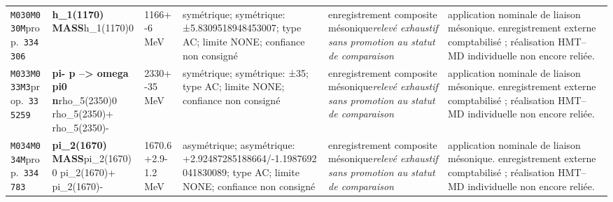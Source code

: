 \begin{landscape}
\begin{longtable}{L{1.85cm}L{4.45cm}L{2.35cm}L{4.05cm}L{3.35cm}L{7.15cm}}
\texttt{M030}\newline \texttt{M030M}\newline prop.\ \texttt{334306} & \textbf{h\_\allowbreak{}1(1170) MASS}\newline h\_\allowbreak{}1(1170)0 & 1166+-6\,MeV & symétrique; symétrique: ±5.8309518948453007; type AC; limite NONE; confiance non consigné & enregistrement composite mésonique\newline \emph{relevé exhaustif sans promotion au statut de comparaison} & application nominale de liaison mésonique. enregistrement externe comptabilisé ; réalisation HMT--MD individuelle non encore reliée. \\
\texttt{M033}\newline \texttt{M033M3}\newline prop.\ \texttt{335259} & \textbf{pi- p --\textgreater{} omega pi0 n}\newline rho\_\allowbreak{}5(2350)0 \textbar{}\allowbreak{} rho\_\allowbreak{}5(2350)+ \textbar{}\allowbreak{} rho\_\allowbreak{}5(2350)- & 2330+-35\,MeV & symétrique; symétrique: ±35; type AC; limite NONE; confiance non consigné & enregistrement composite mésonique\newline \emph{relevé exhaustif sans promotion au statut de comparaison} & application nominale de liaison mésonique. enregistrement externe comptabilisé ; réalisation HMT--MD individuelle non encore reliée. \\
\texttt{M034}\newline \texttt{M034M}\newline prop.\ \texttt{334783} & \textbf{pi\_\allowbreak{}2(1670) MASS}\newline pi\_\allowbreak{}2(1670)0 \textbar{}\allowbreak{} pi\_\allowbreak{}2(1670)+ \textbar{}\allowbreak{} pi\_\allowbreak{}2(1670)- & 1670.6+2.9-1.2\,MeV & asymétrique; asymétrique: +2.92487285188664/-1.1987692041830089; type AC; limite NONE; confiance non consigné & enregistrement composite mésonique\newline \emph{relevé exhaustif sans promotion au statut de comparaison} & application nominale de liaison mésonique. enregistrement externe comptabilisé ; réalisation HMT--MD individuelle non encore reliée. \\

\end{longtable}
\end{landscape}

